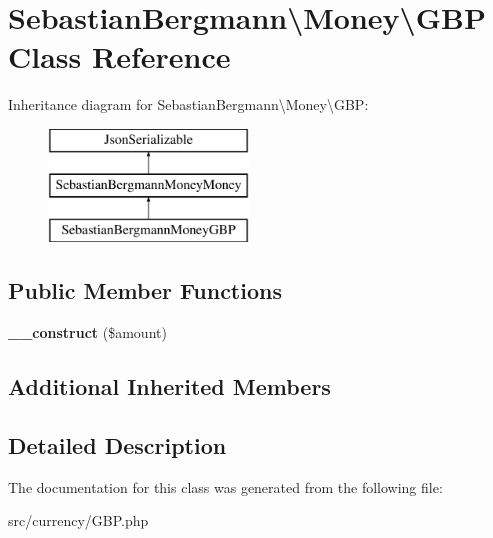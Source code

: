 \hypertarget{classSebastianBergmann_1_1Money_1_1GBP}{}\section{Sebastian\+Bergmann\textbackslash{}Money\textbackslash{}G\+B\+P Class Reference}
\label{classSebastianBergmann_1_1Money_1_1GBP}
Inheritance diagram for Sebastian\+Bergmann\textbackslash{}Money\textbackslash{}G\+B\+P\+:\begin{figure}[H]
\begin{center}
\leavevmode
\includegraphics[height=3.000000cm]{classSebastianBergmann_1_1Money_1_1GBP}
\end{center}
\end{figure}
\subsection*{Public Member Functions}
\begin{DoxyCompactItemize}
\item 
\hypertarget{classSebastianBergmann_1_1Money_1_1GBP_a4c7ef1bf75ef50a405fd45521d78c7fe}{}{\bfseries \+\_\+\+\_\+construct} (\$amount)\label{classSebastianBergmann_1_1Money_1_1GBP_a4c7ef1bf75ef50a405fd45521d78c7fe}

\end{DoxyCompactItemize}
\subsection*{Additional Inherited Members}


\subsection{Detailed Description}


The documentation for this class was generated from the following file\+:\begin{DoxyCompactItemize}
\item 
src/currency/G\+B\+P.\+php\end{DoxyCompactItemize}
